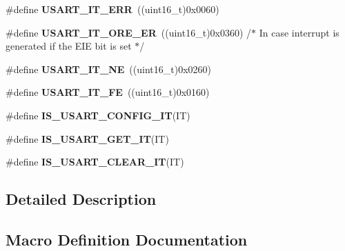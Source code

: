 \begin{DoxyCompactItemize}
\item 
\mbox{\label{group___u_s_a_r_t___interrupt__definition_ga631e83efd4c4789128d80a9539faf78a}} 
\#define {\bfseries U\+S\+A\+R\+T\+\_\+\+I\+T\+\_\+\+E\+RR}~((uint16\+\_\+t)0x0060)
\item 
\mbox{\label{group___u_s_a_r_t___interrupt__definition_ga1faa2d618b7c1038f8cad50fec7d0ba4}} 
\#define {\bfseries U\+S\+A\+R\+T\+\_\+\+I\+T\+\_\+\+O\+R\+E\+\_\+\+ER}~((uint16\+\_\+t)0x0360) /$\ast$ In case interrupt is generated if the E\+I\+E bit is set $\ast$/
\item 
\mbox{\label{group___u_s_a_r_t___interrupt__definition_gad5de042f579b50f1e8643009176486b3}} 
\#define {\bfseries U\+S\+A\+R\+T\+\_\+\+I\+T\+\_\+\+NE}~((uint16\+\_\+t)0x0260)
\item 
\mbox{\label{group___u_s_a_r_t___interrupt__definition_ga9af8790f78f6cb1591506c57d0cc0fb3}} 
\#define {\bfseries U\+S\+A\+R\+T\+\_\+\+I\+T\+\_\+\+FE}~((uint16\+\_\+t)0x0160)
\item 
\#define {\bfseries I\+S\+\_\+\+U\+S\+A\+R\+T\+\_\+\+C\+O\+N\+F\+I\+G\+\_\+\+IT}(IT)
\item 
\#define {\bfseries I\+S\+\_\+\+U\+S\+A\+R\+T\+\_\+\+G\+E\+T\+\_\+\+IT}(IT)
\item 
\#define {\bfseries I\+S\+\_\+\+U\+S\+A\+R\+T\+\_\+\+C\+L\+E\+A\+R\+\_\+\+IT}(IT)
\end{DoxyCompactItemize}


\subsection{Detailed Description}


\subsection{Macro Definition Documentation}
\mbox{\label{group___u_s_a_r_t___interrupt__definition_ga3ceda175140b84eea02a2261ebda4efd}} 
